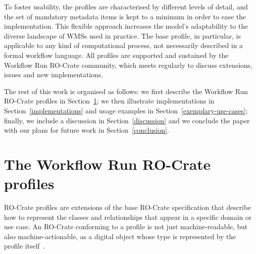 \documentclass[10pt,letterpaper]{article}
\begin{document}
To foster usability, the profiles are characterised by different levels of detail, and the set of mandatory metadata items is kept to a minimum in order to ease the implementation.
This flexible approach increases the model's adaptability to the diverse landscape of WMSs used in practice.
The base profile, in particular, is applicable to any kind of computational process, not necessarily described in a formal workflow language.
All profiles are supported and sustained by the Workflow Run RO-Crate community, which meets regularly to discuss extensions, issues and new implementations.

The rest of this work is organised as follows: we first describe the Workflow Run RO-Crate profiles in Section~\ref{the-workflow-run-ro-crate-profiles}; we then illustrate implementations in Section~\ref{implementations} and usage examples in Section~\ref{exemplary-use-cases}; finally, we include a discussion in Section~\ref{discussion} and we conclude the paper with our plans for future work in Section~\ref{conclusion}.


\section{The Workflow Run RO-Crate profiles}\label{the-workflow-run-ro-crate-profiles}

RO-Crate profiles are extensions of the base RO-Crate specification that describe how to represent the classes and relationships that appear in a specific domain or use case.
An RO-Crate conforming to a profile is not just machine-readable, but also machine-actionable, as a digital object whose type is represented by the profile itself~\cite{Soiland-Reyes 2022b}.
\end{document}
